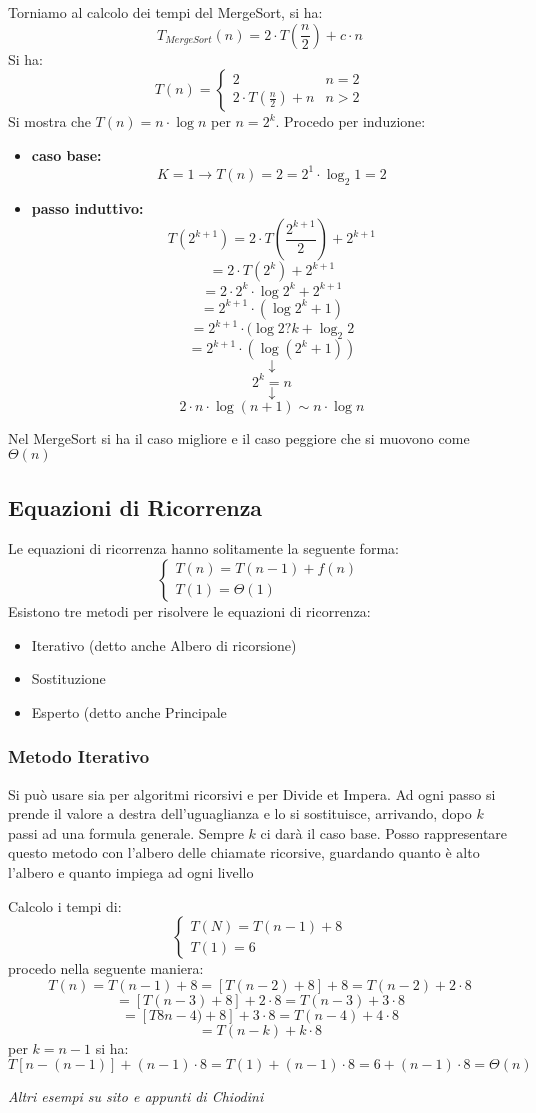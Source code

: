 \documentclass[a4paper,12pt,oneside,tikz]{book}
\begin{document}
Torniamo al calcolo dei tempi del MergeSort, si ha:
$$T_{MergeSort}(n)=2\cdot T\left(\frac{n}{2}\right)+c\cdot n$$
Si ha:
$$T(n)=\begin{cases}
		2                                  & n=2 \\
		2\cdot T\left(\frac{n}{2}\right)+n & n>2
	\end{cases}$$
\newpage
Si mostra che $T(n)=n\cdot \log n$ per $n=2^k$. Procedo per induzione:
\begin{itemize}
	\item \textbf{caso base:}  $$K=1\longrightarrow T(n)=2=2^1\cdot \log_2 1=2$$
	\item  \textbf{passo induttivo:} $$T(2^{k+1})=2\cdot T\left(\frac{2^{k+1}}{2}\right)+2^{k+1}$$ $$=2\cdot T(2^k)+2^{k+1}$$ $$=2\cdot 2^k\cdot \log 2^k +2^{k+1}$$ $$=2^{k+1}\cdot (\log 2^k+1)$$ $$=2^{k+1}\cdot (\log 2?k+\log_2 2 $$ $$=2^{k+1}\cdot (\log (2^k+1))$$ $$\downarrow$$ $$2^k=n$$ $$\downarrow$$ $$2\cdot n\cdot \log (n+1)\sim n\cdot \log n$$
\end{itemize}
Nel MergeSort si ha il caso migliore e il caso peggiore che si muovono come $\Theta(n)$
\subsection{Equazioni di Ricorrenza}
Le equazioni di ricorrenza hanno solitamente la seguente forma:
$$\begin{cases}
		T(n)=T(n-1)+f(n) \\
		T(1)=\Theta(1)
	\end{cases}$$
Esistono tre metodi per risolvere le equazioni di ricorrenza:
\begin{itemize}
	\item Iterativo (detto anche Albero di ricorsione)
	\item Sostituzione
	\item Esperto (detto anche Principale
\end{itemize}
\subsubsection{Metodo Iterativo}
Si può usare sia per algoritmi ricorsivi e per Divide et Impera. Ad ogni passo si prende il valore a destra dell'uguaglianza e lo si sostituisce, arrivando, dopo $k$ passi ad una formula generale. Sempre $k$ ci darà il caso base. Posso rappresentare questo metodo con l'albero delle chiamate ricorsive, guardando quanto è alto l'albero e quanto impiega ad ogni livello
\begin{esempio}
	Calcolo i tempi di:
	$$\begin{cases}
			T(N)=T(n-1)+8 \\
			T(1)=6
		\end{cases}$$
	procedo nella seguente maniera:
	$$T(n)=T(n-1)+8=[T(n-2)+8]+8=T(n-2)+2\cdot 8$$
	$$=[T(n-3)+8]+2\cdot 8= T(n-3)+3\cdot 8$$
	$$=[T8n-4)+8]+3\cdot 8=T(n-4)+4\cdot 8$$
	$$=T(n-k)+k\cdot 8$$
	per $k=n-1$ si ha:
	$$T[n-(n-1)]+(n-1)\cdot 8=T(1)+(n-1)\cdot 8=6+(n-1)\cdot 8=\Theta(n)$$
\end{esempio}
\textit{Altri esempi su sito e appunti di Chiodini}
\end{document}
